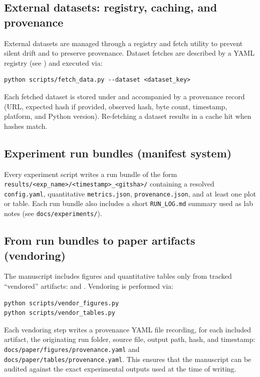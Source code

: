 \documentclass[11pt]{article}
\theoremstyle{definition}
\theoremstyle{plain}
\theoremstyle{remark}
\begin{document}
\subsection{External datasets: registry, caching, and provenance}\label{app:repro:data}
External datasets are managed through a registry and fetch utility to prevent silent drift and to preserve provenance. Dataset fetches are described by a YAML registry (see \texttt{}) and executed via:
\begin{verbatim}
python scripts/fetch_data.py --dataset <dataset_key>
\end{verbatim}
Each fetched dataset is stored under \texttt{} and accompanied by a provenance record (URL, expected hash if provided, observed hash, byte count, timestamp, platform, and Python version). Re-fetching a dataset results in a cache hit when hashes match.

\subsection{Experiment run bundles (manifest system)}\label{app:repro:manifests}
Every experiment script writes a run bundle of the form \texttt{results/\allowbreak <exp\_name>/\allowbreak <timestamp>\_<gitsha>/} containing a resolved \texttt{config.yaml}, quantitative \texttt{metrics.json}, \texttt{provenance.json}, and at least one plot or table. Each run bundle also includes a short \texttt{RUN\_LOG.md} summary used as lab notes (see \texttt{docs/\allowbreak experiments/}).

\subsection{From run bundles to paper artifacts (vendoring)}\label{app:repro:vendoring}
The manuscript includes figures and quantitative tables only from tracked ``vendored'' artifacts:
\texttt{} and \texttt{}.
Vendoring is performed via:
\begin{verbatim}
python scripts/vendor_figures.py
python scripts/vendor_tables.py
\end{verbatim}
Each vendoring step writes a provenance YAML file recording, for each included artifact, the originating run folder, source file, output path, hash, and timestamp: \texttt{docs/\allowbreak paper/\allowbreak figures/\allowbreak provenance.yaml} and \texttt{docs/\allowbreak paper/\allowbreak tables/\allowbreak provenance.yaml}. This ensures that the manuscript can be audited against the exact experimental outputs used at the time of writing.
\end{document}
